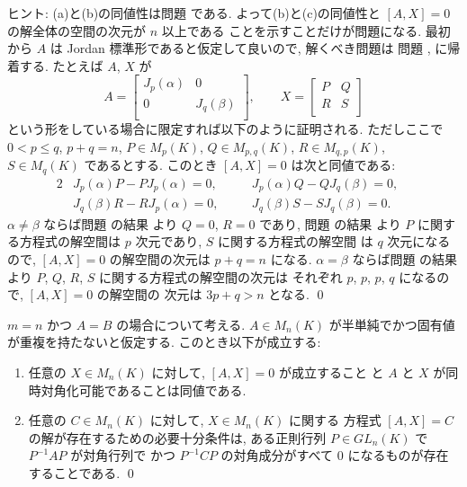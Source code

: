 \documentclass[12pt,twoside]{jarticle}
\begin{document}
\noindent
ヒント: (a)と(b)の同値性は問題  である.
よって(b)と(c)の同値性と $[A,X]=0$ の解全体の空間の次元が $n$ 以上である
ことを示すことだけが問題になる. 
最初から $A$ は Jordan 標準形であると仮定して良いので, 解くべき問題は
問題 ,  に帰着する.  
たとえば $A$, $X$ が
\begin{equation*}
  A = 
  \begin{bmatrix}
    J_p(\alpha) & 0          \\
    0           & J_q(\beta) \\
  \end{bmatrix},
  \qquad
  X = 
  \begin{bmatrix}
    P & Q \\
    R & S \\
  \end{bmatrix}
\end{equation*}
という形をしている場合に限定すれば以下のように証明される. 
ただしここで $0<p\le q$, $p+q=n$, $P\in M_p(K)$, $Q\in M_{p,q}(K)$, 
$R\in M_{q,p}(K)$, $S\in M_q(K)$ であるとする.  
このとき $[A,X]=0$ は次と同値である:
\begin{alignat*}{2}
  &
  J_p(\alpha)P - PJ_p(\alpha) = 0, \quad
  & &
  J_p(\alpha)Q - QJ_q(\beta)  = 0, \quad
  \\ &
  J_q(\beta)R  - RJ_p(\alpha) = 0, \quad
  & &
  J_q(\beta)S  - SJ_q(\beta)  = 0.
\end{alignat*}
$\alpha\ne\beta$ ならば問題  の結果
より $Q=0$, $R=0$ であり, 問題  の結果
より $P$ に関する方程式の解空間は $p$ 次元であり, $S$ に関する方程式の解空間
は $q$ 次元になるので, $[A,X]=0$ の解空間の次元は $p+q=n$ になる.
$\alpha=\beta$ ならば問題  の結果
より $P$, $Q$, $R$, $S$ に関する方程式の解空間の次元は
それぞれ $p$, $p$, $p$, $q$ になるので, $[A,X]=0$ の解空間の
次元は $3p+q > n$ となる.
\qed


\begin{question}
  $m=n$ かつ $A=B$ の場合について考える.
  $A\in M_n(K)$ が半単純でかつ固有値が重複を持たないと仮定する.
  このとき以下が成立する:
  \begin{enumerate}
  \item 任意の $X\in M_n(K)$ に対して, $[A,X]=0$ が成立すること
    と $A$ と $X$ が同時対角化可能であることは同値である.
  \item 任意の $C\in M_n(K)$ に対して, $X\in M_n(K)$ に関する
    方程式 $[A,X]=C$ の解が存在するための必要十分条件は, 
    ある正則行列 $P\in GL_n(K)$ で $P^{-1}AP$ が対角行列で
    かつ $P^{-1}CP$ の対角成分がすべて $0$ になるものが存在することである.
    \qed
  \end{enumerate}
\end{question}
\end{document}
